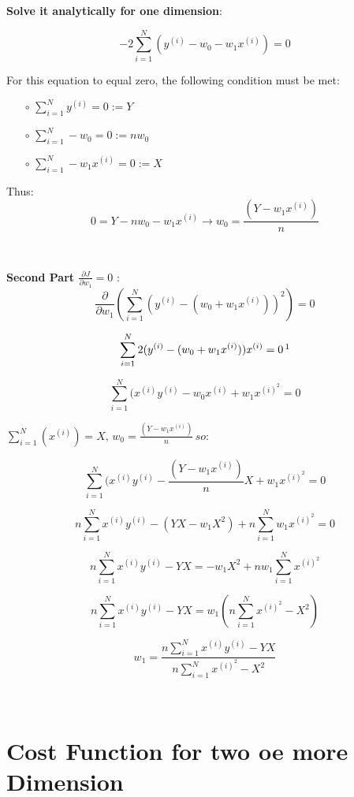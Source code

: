 \documentclass{article}
\newenvironment{cheatformula}[1][כותרת]{
    \begin{minipage}{\linewidth}
    \textbf{#1}:
}{
    \end{minipage}\\[2ex]
}
\begin{document}
\begin{multicols*}{2}
\begin{cheatformula}[Solve it analytically for one dimension]
 $$ -2 \sum_{i=1}^{N}(y^{(i)} -  w_{0} - w_{1}x^{(i)}) = 0 $$

For this equation to equal zero, the following condition must be met:
\begin{itemize}
\item[$\circ$] $\sum_{i=1}^{N}y^{(i)} = 0 := Y$ 
\item[$\circ$] $\sum_{i=1}^{N}-w_{0}  = 0 := n w_{0} $ 
\item[$\circ$] $\sum_{i=1}^{N}-w_{1}x^{(i)}  = 0 := X $ 
\end{itemize}
Thus:
$$ 0 = Y - n w_{0} -w_{1}x^{(i)} \longrightarrow  w_{0} = \frac{(Y -w_{1}x^{(i)})}{n} $$
\end{cheatformula}


\begin{cheatformula}[Second Part $\frac{\partial J}{\partial w_{1}} = 0$ ]\\

$$ \frac{\partial }{\partial w_{1}}  ( \sum_{i=1}^{N}(y^{(i)} -  (w_{0} + w_{1}x^{(i)}))^{2}) = 0   $$

$$  \sum_{i=1}^{N} 2(y^{(i)} -  (w_{0} + w_{1}x^{(i)})) x^{(i)} = 0  \, \footnotemark $$

$$  \sum_{i=1}^{N} (x^{(i)}y^{(i)} - w_{0}x^{(i)} + w_{1}x^{(i)^{2}} = 0 $$

$ \sum_{i=1}^{N} (x^{(i)})=X   ,\,  w_{0} = \frac{(Y -w_{1}x^{(i)})}{n} \, so: $

$$  \sum_{i=1}^{N} (x^{(i)}y^{(i)} - \frac{(Y -w_{1}x^{(i)})}{n} X  + w_{1}x^{(i)^{2}} = 0 $$

$$  n \sum_{i=1}^{N} x^{(i)}y^{(i)} - {(YX -w_{1}X^{2})}   + n\sum_{i=1}^{N}w_{1}x^{(i)^{2}} = 0 $$

$$  n \sum_{i=1}^{N} x^{(i)}y^{(i)} - YX=  - w_{1}X^{2}   + n w_{1}\sum_{i=1}^{N}x^{(i)^{2}}  $$

$$n \sum_{i=1}^{N} x^{(i)}y^{(i)} - YX = w_{1} (n \sum_{i=1}^{N}x^{(i)^{2}} - X^{2})$$

$$w_{1} = \frac{n \sum_{i=1}^{N} x^{(i)}y^{(i)} - YX}{n \sum_{i=1}^{N}x^{(i)^{2}} - X^{2}}$$

 
\end{cheatformula}
\pagebreak


\section{Cost Function for two oe more Dimension}


\end{multicols*}
\end{document}
